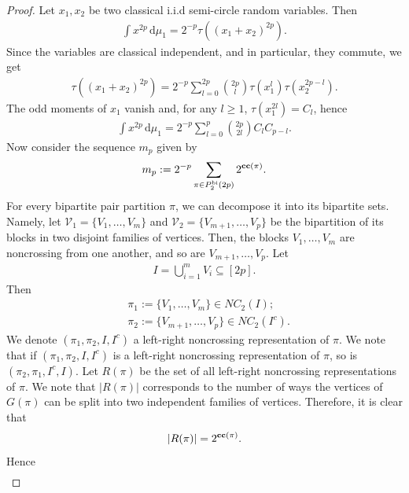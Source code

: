 \documentclass[12pt,reqno]{amsart}
\theoremstyle{plain}
\newcommand{\1}{\mathbf{1}}
\newcommand{\ccblocks}{\operatorname{\bf cc}}
\begin{document}
\begin{proof}
    Let $x_1,x_2$ be two classical i.i.d semi-circle random variables. Then
    \begin{align*}
        \int x^{2p}\, \text{d}\mu_1=2^{-p}\tau\left((x_1+x_2)^{2p}\right).
    \end{align*}
    Since the variables are classical independent, and in particular, they commute, we get
    \begin{align*}
        \tau\left((x_1+x_2)^{2p}\right)=2^{-p}\sum_{l=0}^{2p}\binom{2p}{l}\tau(x_1^{l})\tau(x_2^{2p-l}).
    \end{align*}
    The odd moments of $x_1$ vanish and, for any $l \ge 1$, $\tau(x_1^{2l})=C_l$, hence
    \begin{align*}
        \int x^{2p}\, \text{d}\mu_1=2^{-p}\sum_{l=0}^p\binom{2p}{2l}C_lC_{p-l}.
    \end{align*}
    Now consider the sequence $m_p$ given by
    \begin{align*}
        m_p:=2^{-p}\sum_{\pi \in P_2^{\operatorname{bi}}(2p)}2^{\ccblocks(\pi)}.
    \end{align*}
    For every bipartite pair partition $\pi$, we can decompose it into its bipartite sets. Namely, let $\mathcal{V}_1=\{V_1,\ldots, V_m\}$ and $\mathcal{V}_2=\{V_{m+1},\ldots, V_p\}$ be the bipartition of its blocks in two disjoint families of vertices. Then, the blocks $V_1,\ldots,V_m$ are noncrossing from one another, and so are $V_{m+1},\ldots, V_p$. Let
    \begin{align*}
        I=\bigcup_{i=1}^m V_i \subseteq [2p].
    \end{align*}
    Then
    \begin{align*}
        &\pi_1:=\{V_1,\ldots,V_m\} \in NC_2\left(I\right);\\
        &\pi_2:=\{V_{m+1},\ldots,V_p\} \in NC_2\left(I^c\right).
    \end{align*}
    We denote $(\pi_1,\pi_2,I,I^c)$ a left-right noncrossing representation of $\pi$. We note that if $(\pi_1,\pi_2,I,I^c)$ is a left-right noncrossing representation of $\pi$, so is $(\pi_2,\pi_1,I^c,I)$. Let $R(\pi)$ be the set of all left-right noncrossing representations of $\pi$. We note that $|R(\pi)|$ corresponds to the number of ways the vertices of $G(\pi)$ can be split into two independent families of vertices. Therefore, it is clear that
    \begin{align*}
        |R(\pi)|=2^{\ccblocks(\pi)}.
    \end{align*}
    Hence
    \begin{align}\label{eq: sum over bipartite partitions and representations}

\end{align}
\end{proof}
\end{document}
